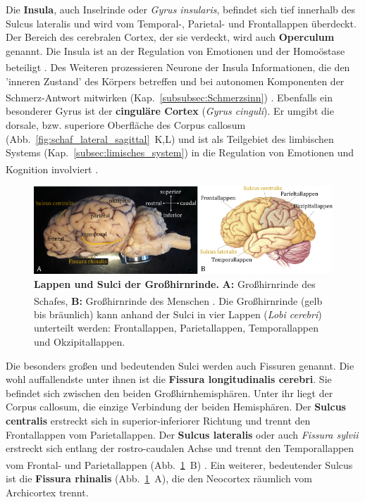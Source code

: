 \documentclass[12pt,a4paper,pdftex]{article}
\begin{document}
\noindent Die \textbf{Insula}, auch Inselrinde oder \textit{Gyrus insularis}, befindet sich tief innerhalb des Sulcus lateralis und wird vom Temporal-, Parietal- und Frontallappen überdeckt. Der Bereich des cerebralen Cortex, der sie verdeckt, wird auch \textbf{Operculum} genannt. Die Insula ist an der Regulation von Emotionen und der Homoöstase beteiligt \textsuperscript{\cite[15]{kandel2013principles}}. Des Weiteren prozessieren Neurone der Insula Informationen, die den 'inneren Zustand' des Körpers betreffen und bei autonomen Komponenten der Schmerz-Antwort mitwirken (Kap.~\ref{subsubsec:Schmerzsinn}) \textsuperscript{\cite[24]{kandel2013principles}}. Ebenfalls ein besonderer Gyrus ist der \textbf{cinguläre Cortex} (\textit{Gyrus cinguli}). Er umgibt die dorsale, bzw. superiore Oberfläche des Corpus callosum (Abb.~\ref{fig:schaf_lateral_sagittal}~K,L) und ist als Teilgebiet des limbischen Systems (Kap.~\ref{subsec:limisches_system}) in die Regulation von Emotionen und Kognition involviert \textsuperscript{\cite[15]{kandel2013principles}}.

\begin{figure}[H]
	\centering
	\includegraphics[width=\textwidth]{pictures/Bilder_Jule/Andere/grosshirnrinde.png}
	\caption[Lappen und Sulci der Großhirnrinde]{\textbf{Lappen und Sulci der Großhirnrinde.} \textbf{A:} Großhirnrinde des Schafes, \textbf{B:} Großhirnrinde des Menschen \textsuperscript{\cite[7]{neurowissenschaften_baer}}. Die Großhirnrinde (gelb bis bräunlich) kann anhand der Sulci in vier Lappen (\textit{Lobi cerebri}) unterteilt werden: Frontallappen, Parietallappen, Temporallappen und Okzipitallappen.}
	\label{fig:cortex_lappen} 
\end{figure}

\noindent Die besonders großen und bedeutenden Sulci werden auch Fissuren genannt. Die wohl auffallendste unter ihnen ist die \textbf{Fissura longitudinalis cerebri}. Sie befindet sich zwischen den beiden Großhirnhemisphären. Unter ihr liegt der Corpus callosum, die einzige Verbindung der beiden Hemisphären. Der \textbf{Sulcus centralis} erstreckt sich in superior-inferiorer Richtung und trennt den Frontallappen vom Parietallappen. Der \textbf{Sulcus lateralis} oder auch \textit{Fissura sylvii} erstreckt sich entlang der rostro-caudalen Achse und trennt den Temporallappen vom Frontal- und Parietallappen (Abb.~\ref{fig:cortex_lappen}~B) \textsuperscript{\cite[7]{neurowissenschaften_baer}}. Ein weiterer, bedeutender Sulcus ist die \textbf{Fissura rhinalis} (Abb.~\ref{fig:cortex_lappen}~A), die den Neocortex räumlich vom Archicortex trennt. 
\end{document}
